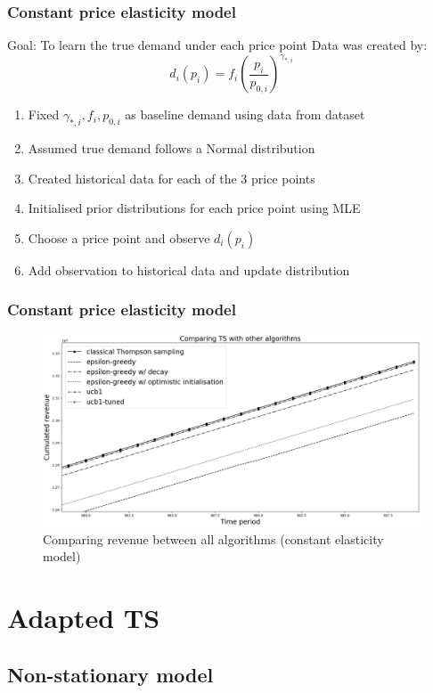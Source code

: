 \documentclass[11pt]{beamer}
\begin{document}
\begin{frame}
\frametitle{Constant price elasticity model}
Goal: To learn the true demand under each price point
\newline
\newline
Data was created by:
\[d_i(p_i) = f_i \left(\frac{p_i}{p_{0,i}}\right)^{\gamma_{*,i}} \]
\begin{enumerate}
\item Fixed $\gamma_{*,i}, f_i, p_{0,i}$ as baseline demand using data from dataset
\item Assumed true demand follows a Normal distribution
\item Created historical data for each of the 3 price points
\item Initialised prior distributions for each price point using MLE
\item Choose a price point and observe $d_i(p_i)$
\item Add observation to historical data and update distribution
\end{enumerate}
\end{frame}

\begin{frame}
\frametitle{Constant price elasticity model}
\begin{figure}[h]
\centering
\includegraphics[width=1\textwidth]{6-2.png}
\caption{Comparing revenue between all algorithms (constant elasticity model)}
\end{figure}
\end{frame}

\section{Adapted TS}
\subsection{Non-stationary model}
\end{document}
